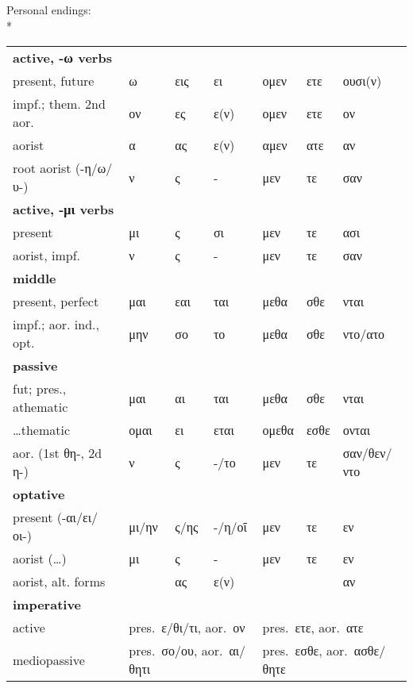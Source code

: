 \begin{small}
Personal endings:\\*
%
\begin{tabular}{lllllll}
\textbf{active, -ω verbs}\\
present, future              & ω      & εις\footnotemark  & ει\footnotemark[3]  & ομεν    & ετε    & ουσι(ν) \\
impf.; them. 2nd aor.        & ον\footnotemark[4] & ες      & ε(ν)      & ομεν    &	ετε    & ον\footnotemark[4] \\
aorist                       & α      & ας      & ε(ν)      & αμεν    & ατε    & αν\footnotemark[5] \\
root aorist (-η/ω/υ-)        & \tca{}ν & \tca{}ς  & \tca{}-  & \tca{}μεν & \tca{}τε & \tca{}σαν \\
\textbf{active, -μι verbs}\\
present                      & μι     & ς       & σι        & μεν     & τε     & ασι \\
aorist, impf.                & \tca{}ν & \tca{}ς  & \tca{}-  & \tca{}μεν & \tca{}τε & \tca{}σαν \\
\textbf{middle}\\
present, perfect             & \tcb{}μαι & εαι  & \tcb{}ται & \tcb{}μεθα & \tcb{}σθε & \tcb{}νται \\
impf.; aor. ind., opt.       & μην    & σο      & το        & μεθα    &	σθε    & ντο/ατο\\
\textbf{passive}\\
fut; pres., athematic        & \tcb{}μαι  & αι  & \tcb{}ται & \tcb{}μεθα & \tcb{}σθε & \tcb{}νται \\
\ldots thematic              & ομαι   & ει\footnotemark[3] & εται      & ομεθα   & εσθε   & ονται \\
aor. (1st θη-, 2d η-)        & \tca{}ν & \tca{}ς  & \tca{}-/το  & \tca{}μεν & \tca{}τε & \tca{}σαν/θεν/ντο \\
\textbf{optative}\\
present (-αι/ει/οι-)         & μι/ην  & ς/ης    & -/η/οῖ    & μεν     & τε     & εν \\
aorist (\ldots)              & μι     & ς       & -         & μεν     & τε     & εν \\
aorist, alt. forms           &        & ας      & ε(ν)      &         &        & αν \\
\textbf{imperative}\\
active                       &  \multicolumn{3}{l}{pres.~ε/θι/τι\footnotemark[6], aor.~ον}   & \multicolumn{3}{l}{pres.~ετε, aor.~ατε }      \\
mediopassive                 &  \multicolumn{3}{l}{pres.~σο/ου, aor.~αι/θητι}                & \multicolumn{3}{l}{pres.~εσθε, aor.~ασθε/θητε }     \\
\end{tabular}


\end{small}

